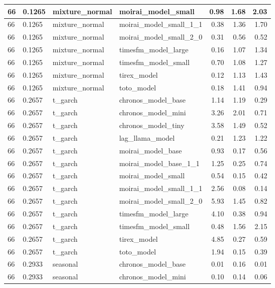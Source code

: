 {\begin{tabular}{llllrrr}
\midrule
66 & 0.1265 & mixture\_normal & moirai\_model\_small & 0.98 & 1.68 & 2.03 \\
\midrule
66 & 0.1265 & mixture\_normal & moirai\_model\_small\_1\_1 & 0.38 & 1.36 & 1.70 \\
\midrule
66 & 0.1265 & mixture\_normal & moirai\_model\_small\_2\_0 & 0.31 & 0.56 & 0.52 \\
\midrule
66 & 0.1265 & mixture\_normal & timesfm\_model\_large & 0.16 & 1.07 & 1.34 \\
\midrule
66 & 0.1265 & mixture\_normal & timesfm\_model\_small & 0.70 & 1.08 & 1.27 \\
\midrule
66 & 0.1265 & mixture\_normal & tirex\_model & 0.12 & 1.13 & 1.43 \\
\midrule
66 & 0.1265 & mixture\_normal & toto\_model & 0.18 & 1.41 & 0.94 \\
\midrule
66 & 0.2657 & t\_garch & chronos\_model\_base & 1.14 & 1.19 & 0.29 \\
\midrule
66 & 0.2657 & t\_garch & chronos\_model\_mini & 3.26 & 2.01 & 0.71 \\
\midrule
66 & 0.2657 & t\_garch & chronos\_model\_tiny & 3.58 & 1.49 & 0.52 \\
\midrule
66 & 0.2657 & t\_garch & lag\_llama\_model & 0.21 & 1.23 & 1.22 \\
\midrule
66 & 0.2657 & t\_garch & moirai\_model\_base & 0.93 & 0.17 & 0.56 \\
\midrule
66 & 0.2657 & t\_garch & moirai\_model\_base\_1\_1 & 1.25 & 0.25 & 0.74 \\
\midrule
66 & 0.2657 & t\_garch & moirai\_model\_small & 0.54 & 0.15 & 0.42 \\
\midrule
66 & 0.2657 & t\_garch & moirai\_model\_small\_1\_1 & 2.56 & 0.08 & 0.14 \\
\midrule
66 & 0.2657 & t\_garch & moirai\_model\_small\_2\_0 & 5.93 & 1.45 & 0.82 \\
\midrule
66 & 0.2657 & t\_garch & timesfm\_model\_large & 4.10 & 0.38 & 0.94 \\
\midrule
66 & 0.2657 & t\_garch & timesfm\_model\_small & 0.48 & 1.56 & 2.15 \\
\midrule
66 & 0.2657 & t\_garch & tirex\_model & 4.85 & 0.27 & 0.59 \\
\midrule
66 & 0.2657 & t\_garch & toto\_model & 1.94 & 0.15 & 0.39 \\
\midrule
66 & 0.2933 & seasonal & chronos\_model\_base & 0.01 & 0.16 & 0.01 \\
\midrule
66 & 0.2933 & seasonal & chronos\_model\_mini & 0.10 & 0.14 & 0.06 \\

\end{tabular}}
